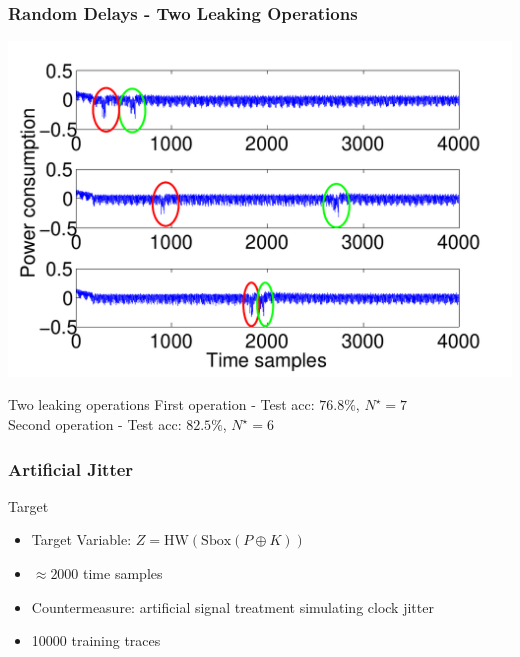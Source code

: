 %

\begin{frame}
\frametitle{Random Delays - Two Leaking Operations}

\centering
\includegraphics[width=.5\textwidth]{../Figures/CHES2017/CW_double_shift_traces.pdf}	


\begin{block}{Two leaking operations}
First operation - Test acc: $76.8\%$, $N^\star=7$\\
Second operation - Test acc: $82.5\%$, $N^\star=6$
\end{block}

\end{frame}

\begin{frame}
\frametitle{Artificial Jitter}
\begin{figure}
\end{figure}
\begin{block}{Target}

\begin{itemize}
\item Target Variable: $Z = \mathrm{HW}(\mathrm{Sbox}(P\oplus K))$
\item $\approx 2000$ time samples
\item Countermeasure: artificial signal treatment simulating clock jitter
\item 10000 training traces
\end{itemize}
\end{block}


\end{frame}

